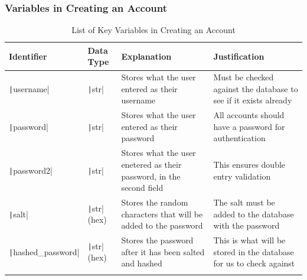\documentclass[12pt]{report}
\newcommand{\pil}[1]{\protect\texttt|#1|}
\begin{document}
\subsubsection{Variables in Creating an Account}
\begin{center}
\begin{longtable}{ | m{3cm} | m{4cm}| m{4cm} | m{4cm} |} 
    \hline
    \textbf{Identifier} & \textbf{Data Type} & \textbf{Explanation}  & \textbf{Justification} \\ 
    \hline
    \pil{username} & \pil{str} & Stores what the user entered as their username & Must be checked against the database to see if it exists already \\ 
    \hline
    \pil{password} & \pil{str} & Stores what the user entered as their password & All accounts should have a password for authentication \\ 
    \hline
    \pil{password2} & \pil{str} & Stores what the user enetered as their password, in the second field & This ensures double entry validation \\ 
    \hline
    \pil{salt} & \pil{str} (hex) & Stores the random characters that will be added to the password & The salt must be added to the database with the password \\ 
    \hline
    \pil{hashed_password} & \pil{str} (hex) & Stores the password after it has been salted and hashed & This is what will be stored in the database for us to check against \\ 
    \hline
\caption{List of Key Variables in Creating an Account}
\end{longtable}
\end{center}
\end{document}
